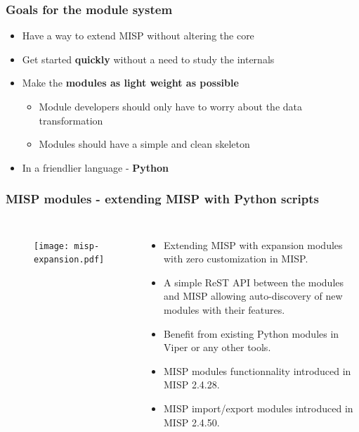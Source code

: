 \begin{frame}[fragile]
        \frametitle{Goals for the module system}
        \begin{itemize}
        \item Have a way to extend MISP without altering the core
        \item Get started {\bf quickly} without a need to study the internals
        \item Make the {\bf modules as light weight as possible}
            \begin{itemize}
                \item Module developers should only have to worry about the data transformation
                \item Modules should have a simple and clean skeleton
            \end{itemize}
        \item In a friendlier language - {\bf Python}
        \end{itemize}
\end{frame}

\begin{frame}
        \frametitle{MISP modules - extending MISP with Python scripts}
        \begin{columns}[t]
        \column{5.6cm}
        \begin{figure}
        \texttt{[image: misp-expansion.pdf]}
        \end{figure}
        \column{6.4cm}
        \begin{itemize}
                \item Extending MISP with expansion modules with zero customization in MISP.
                \item A simple ReST API between the modules and MISP allowing auto-discovery of new modules with their features.
                \item Benefit from existing Python modules in Viper or any other tools.
                \item MISP modules functionnality introduced in MISP 2.4.28.
                \item MISP import/export modules introduced in MISP 2.4.50.
        \end{itemize}
         \end{columns}
\end{frame}

